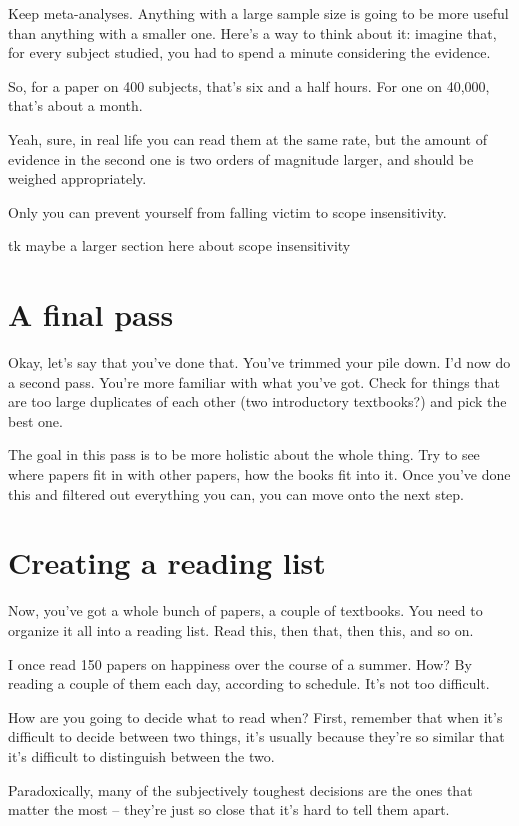 Keep meta-analyses. Anything with a large sample size is going to be more useful
than anything with a smaller one. Here's a way to think about it: imagine that,
for every subject studied, you had to spend a minute considering the evidence.

So, for a paper on 400 subjects, that's six and a half hours. For one on 40,000,
that's about a month.

Yeah, sure, in real life you can read them at the same rate, but the amount of
evidence in the second one is two orders of magnitude larger, and should be
weighed appropriately.

Only you can prevent yourself from falling victim to scope insensitivity.

tk maybe a larger section here about scope insensitivity

\section{A final pass}

Okay, let's say that you've done that. You've trimmed your pile down. I'd now do
a second pass. You're more familiar with what you've got. Check for things that
are too large duplicates of each other (two introductory textbooks?) and pick
the best one.

The goal in this pass is to be more holistic about the whole thing. Try to see
where papers fit in with other papers, how the books fit into it. Once you've
done this and filtered out everything you can, you can move onto the next step.

\section{Creating a reading list}

Now, you've got a whole bunch of papers, a couple of textbooks. You need to
organize it all into a reading list. Read this, then that, then this, and so on.

I once read 150 papers on happiness over the course of a summer. How? By reading
a couple of them each day, according to schedule. It's not too difficult.

 How are you going to decide what to read when? First, remember that
when it's difficult to decide between two things, it's usually because they're
so similar that it's difficult to distinguish between the two.

Paradoxically, many of the subjectively toughest decisions are the ones that
matter the most -- they're just so close that it's hard to tell them apart.


